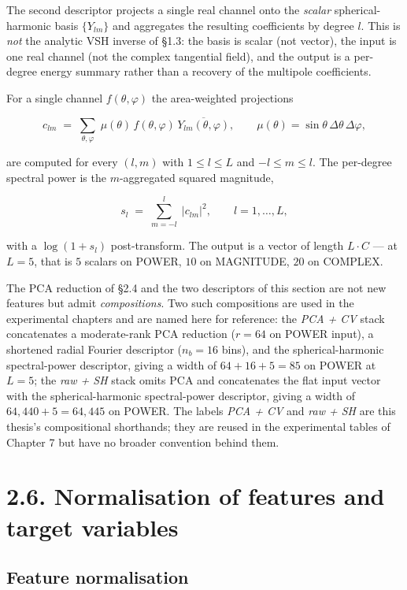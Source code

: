 \documentclass[
  english,
  11pt,
]{report}
\begin{document}
The second descriptor projects a single real channel onto the
\emph{scalar} spherical-harmonic basis \(\{Y_{lm}\}\) and aggregates the
resulting coefficients by degree \(l\). This is \emph{not} the analytic
VSH inverse of §1.3: the basis is scalar (not vector), the input is one
real channel (not the complex tangential field), and the output is a
per-degree energy summary rather than a recovery of the multipole
coefficients.

For a single channel \(f(\theta,\varphi)\) the area-weighted projections

\[
c_{lm}\;=\;\sum_{\theta,\varphi}\;\mu(\theta)\,f(\theta,\varphi)\,\overline{Y_{lm}(\theta,\varphi)},\qquad \mu(\theta) = \sin\theta\,\Delta\theta\,\Delta\varphi,
\]

are computed for every \((l, m)\) with \(1 \le l \le L\) and
\(-l \le m \le l\). The per-degree spectral power is the
\(m\)-aggregated squared magnitude,

\[
s_l\;=\;\sum_{m=-l}^{l}\;|c_{lm}|^2,\qquad l = 1, \dots, L,
\]

with a \(\log(1 + s_l)\) post-transform. The output is a vector of
length \(L \cdot C\) --- at \(L = 5\), that is \(5\) scalars on POWER,
\(10\) on MAGNITUDE, \(20\) on COMPLEX.

The PCA reduction of §2.4 and the two descriptors of this section are
not new features but admit \emph{compositions}. Two such compositions
are used in the experimental chapters and are named here for reference:
the \emph{PCA + CV} stack concatenates a moderate-rank PCA reduction
(\(r = 64\) on POWER input), a shortened radial Fourier descriptor
(\(n_b = 16\) bins), and the spherical-harmonic spectral-power
descriptor, giving a width of \(64 + 16 + 5 = 85\) on POWER at
\(L = 5\); the \emph{raw + SH} stack omits PCA and concatenates the flat
input vector with the spherical-harmonic spectral-power descriptor,
giving a width of \(64{,}440 + 5 = 64{,}445\) on POWER. The labels
\emph{PCA + CV} and \emph{raw + SH} are this thesis's compositional
shorthands; they are reused in the experimental tables of Chapter 7 but
have no broader convention behind them.

\section{2.6. Normalisation of features and target
variables}\label{normalisation-of-features-and-target-variables}

\subsection{Feature normalisation}\label{feature-normalisation}
\end{document}
